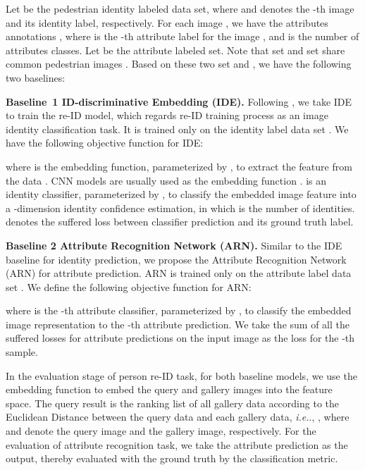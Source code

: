 \documentclass[5p,times,twocolumn]{elsarticle}
\def\ie{\emph{i.e.}}
\begin{document}
Let  be the pedestrian identity labeled data set, where  and  denotes the -th image and its identity label, respectively.
For each image , we have the attributes annotations , where  is the -th attribute label for the image , and  is the number of attributes classes. 
Let  be the attribute labeled set.
Note that set  and set  share common pedestrian images .
Based on these two set  and , we have the following two baselines:
    
\textbf{Baseline~1 ID-discriminative Embedding (IDE).} 
Following \cite{Zheng_2015_ICCV}, we take IDE to train the re-ID model, which regards re-ID training process as an image identity classification task.
It is trained only on the identity label data set . We have the following objective function for IDE:

{

}

\noindent
where  is the embedding function, parameterized by , to extract the feature from the data . CNN models \cite{Zheng_2015_ICCV,zheng2017discriminatively} are usually used as the embedding function .
 is an identity classifier, parameterized by , to classify the embedded image feature  into a -dimension identity confidence estimation, in which  is the number of identities. 
 denotes the suffered loss between classifier prediction and its ground truth label.


\textbf{Baseline 2 Attribute Recognition Network (ARN).} Similar to the IDE baseline for identity prediction, we propose the Attribute Recognition Network (ARN) for attribute prediction. 
ARN is trained only on the attribute label data set . We define the following objective function for ARN:

{

}

\noindent
where  is the -th attribute classifier, parameterized by , to classify the embedded image representation  to the -th attribute prediction. We take the sum of all the suffered losses for  attribute predictions on the input image  as the loss for the -th sample.

In the evaluation stage of person re-ID task, for both baseline models, we use the embedding function  to embed the query and gallery images into the feature space. 
The query result is the ranking list of all gallery data according to the Euclidean Distance between the query data and each gallery data, \ie., , where  and  denote the query image and the gallery image, respectively.
For the evaluation of attribute recognition task, we take the attribute prediction  as the output, thereby evaluated with the ground truth by the classification metric.
\end{document}
